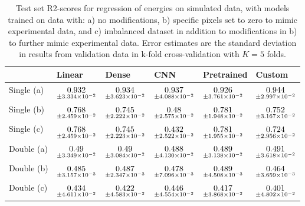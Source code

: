 \begin{table}
\centering
\caption{
Test set R2-scores for regression of energies on simulated data, with models trained on data with: 
a) no modifications, b) specific pixels set to zero to mimic experimental data, and c) imbalanced dataset
in addition to modifications in b) to further mimic experimental data. Error estimates are the standard deviation 
in results from validation data in k-fold cross-validation with $K=5$ folds.
}
\label{tab:regression-simulated-all-energies-r2}
\begin{tabular}{llllll}
\toprule
{} &                                              Linear &                                               Dense &                                                 CNN &                                          Pretrained &                                              Custom \\
\midrule
Single (a) &  $\underset{\num{+- 3.334e-02 }  }{\num{ 0.932 } }$ &  $\underset{\num{+- 3.623e-02 }  }{\num{ 0.934 } }$ &  $\underset{\num{+- 4.088e-02 }  }{\num{ 0.937 } }$ &  $\underset{\num{+- 3.761e-02 }  }{\num{ 0.926 } }$ &  $\underset{\num{+- 2.997e-02 }  }{\num{ 0.944 } }$ \\
Single (b) &  $\underset{\num{+- 2.459e-02 }  }{\num{ 0.768 } }$ &  $\underset{\num{+- 2.222e-02 }  }{\num{ 0.745 } }$ &  $\underset{\num{+- 2.575e-02 }  }{\num{ 0.48 } }$ &  $\underset{\num{+- 1.948e-02 }  }{\num{ 0.781 } }$ &  $\underset{\num{+- 3.167e-02 }  }{\num{ 0.752 } }$ \\
Single (c) &  $\underset{\num{+- 2.459e-02 }  }{\num{ 0.768 } }$ &  $\underset{\num{+- 2.223e-02 }  }{\num{ 0.745 } }$ &  $\underset{\num{+- 2.522e-02 }  }{\num{ 0.432 } }$ &  $\underset{\num{+- 1.955e-02 }  }{\num{ 0.781 } }$ &  $\underset{\num{+- 2.956e-02 }  }{\num{ 0.724 } }$ \\
Double (a) &  $\underset{\num{+- 3.349e-02 }  }{\num{ 0.49 } }$ &  $\underset{\num{+- 3.084e-02 }  }{\num{ 0.49 } }$ &  $\underset{\num{+- 4.130e-02 }  }{\num{ 0.488 } }$ &  $\underset{\num{+- 3.138e-02 }  }{\num{ 0.489 } }$ &  $\underset{\num{+- 3.618e-02 }  }{\num{ 0.491 } }$ \\
Double (b) &  $\underset{\num{+- 3.157e-03 }  }{\num{ 0.485 } }$ &  $\underset{\num{+- 2.347e-03 }  }{\num{ 0.487 } }$ &  $\underset{\num{+- 7.096e-03 }  }{\num{ 0.478 } }$ &  $\underset{\num{+- 4.508e-03 }  }{\num{ 0.489 } }$ &  $\underset{\num{+- 3.659e-03 }  }{\num{ 0.464 } }$ \\
Double (c) &  $\underset{\num{+- 4.611e-02 }  }{\num{ 0.434 } }$ &  $\underset{\num{+- 4.583e-02 }  }{\num{ 0.422 } }$ &  $\underset{\num{+- 4.554e-02 }  }{\num{ 0.446 } }$ &  $\underset{\num{+- 3.868e-02 }  }{\num{ 0.417 } }$ &  $\underset{\num{+- 4.802e-02 }  }{\num{ 0.401 } }$ \\
\bottomrule
\end{tabular}
\end{table}
